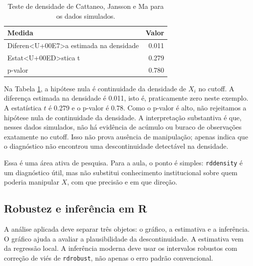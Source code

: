 \documentclass[
]{article}
\begin{document}
\begin{table}

\caption{\label{tab:Cattaneo-test}Teste de densidade de Cattaneo, Jansson e Ma para os dados simulados.}
\centering
\begin{tabular}[t]{l|r}
\hline
Medida & Valor\\
\hline
Diferen<U+00E7>a estimada na densidade & 0.011\\
\hline
Estat<U+00ED>stica t & 0.279\\
\hline
p-valor & 0.780\\
\hline
\end{tabular}
\end{table}

Na Tabela \ref{tab:Cattaneo-test}, a hipótese nula é continuidade da densidade de \(X_i\) no cutoff. A diferença estimada na densidade é 0.011, isto é, praticamente zero neste exemplo. A estatística \(t\) é 0.279 e o p-valor é 0.78. Como o p-valor é alto, não rejeitamos a hipótese nula de continuidade da densidade. A interpretação substantiva é que, nesses dados simulados, não há evidência de acúmulo ou buraco de observações exatamente no cutoff. Isso não prova ausência de manipulação; apenas indica que o diagnóstico não encontrou uma descontinuidade detectável na densidade.

Essa é uma área ativa de pesquisa. Para a aula, o ponto é simples: \texttt{rddensity} é um diagnóstico útil, mas não substitui conhecimento institucional sobre quem poderia manipular \(X\), com que precisão e em que direção.

\subsection{Robustez e inferência em R}\label{robustez-e-inferuxeancia-em-r}

A análise aplicada deve separar três objetos: o gráfico, a estimativa e a inferência. O gráfico ajuda a avaliar a plausibilidade da descontinuidade. A estimativa vem da regressão local. A inferência moderna deve usar os intervalos robustos com correção de viés de \texttt{rdrobust}, não apenas o erro padrão convencional.
\end{document}
